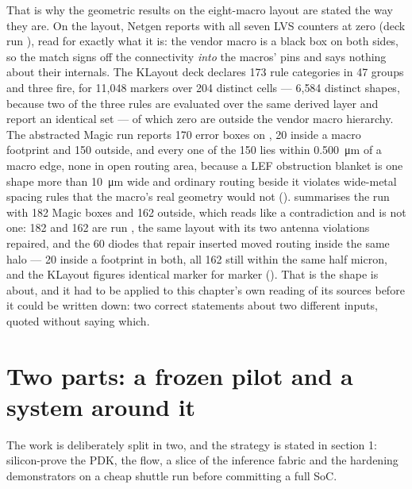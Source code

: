 That is why the geometric results on the eight-macro layout are stated
the way they are. On the  layout, Netgen reports
 with all seven LVS counters at zero
(deck run ), read
for exactly what it is: the vendor macro is a black box on both sides,
so the match signs off the connectivity \emph{into} the macros' pins and
says nothing about their internals. The KLayout deck declares 173 rule
categories in 47 groups and three fire, for 11{,}048 markers over 204
distinct cells --- 6{,}584 distinct shapes, because two of the three
rules are evaluated over the same derived layer and report an identical
set --- of which zero are outside the vendor macro hierarchy. The
abstracted Magic run reports 170 error boxes on ,
20 inside a macro
footprint and 150 outside, and every one of the 150 lies within
\qty{0.500}{\um} of a macro edge, none in open routing area,
because a LEF obstruction blanket is one shape more than
\qty{10}{\um} wide and ordinary routing beside it violates
wide-metal spacing rules that the macro's real geometry would not
().  summarises the run with 182
Magic boxes and 162 outside, which reads like a contradiction and is
not one: 182 and 162 are run , the same layout with its
two antenna violations repaired, and the 60 diodes that repair inserted
moved routing inside the same halo --- 20 inside a footprint in both,
all 162 still within the same half micron, and the KLayout figures
identical marker for marker (). That is the shape
 is about, and it had to be applied to this
chapter's own reading of its sources before it could be written down:
two correct statements about two different inputs, quoted without
saying which.

\section{Two parts: a frozen pilot and a system around it}
\label{sec:intro-two-parts}

The work is deliberately split in two, and the strategy is stated in
 section 1: silicon-prove the PDK, the flow, a slice of
the inference fabric and the hardening demonstrators on a cheap shuttle
run before committing a full SoC.

